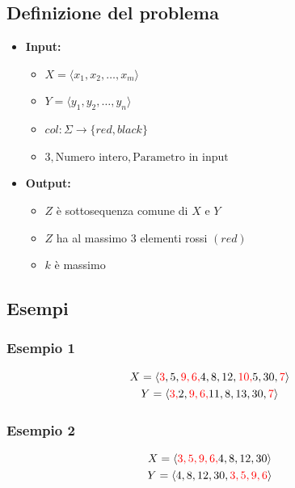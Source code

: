 \subsection{Definizione del problema}
\begin{itemize}
    \item \textbf{Input:}
    \begin{itemize}
        \item $X = \langle x_1, x_2, \dots, x_m \rangle$
        \item $Y = \langle y_1, y_2, \dots, y_n \rangle$
        \item $col: \Sigma \to \{red,black\}$
        \item $3, \text{Numero intero}, \text{Parametro in input}$
    \end{itemize}
    \item \textbf{Output:}
    \begin{itemize}
        \item $Z$ è sottosequenza comune di $X$ e $Y$
        \item $Z$ ha al massimo $3$ elementi rossi $(red)$
        \item $k$ è massimo
    \end{itemize}
\end{itemize}

\subsection{Esempi}

\subsubsection{Esempio 1}
{
    \Large
    \begin{gather*}
        X = \langle {\color{red} 3},5, {\color{red}9,6,}4,8,12, {\color{red} 10,}5,30 ,{\color{red} 7}\rangle \\
        Y = \langle {\color{red} 3,}2, {\color{red} 9,6,} 11, 8, 13, 30, {\color{red} 7} \rangle
    \end{gather*}
}

\subsubsection{Esempio 2}
{
    \Large
    \begin{gather*}
        X = \langle {\color{red} 3,5,9,6,} 4,8,12,30 \rangle \\
        Y = \langle 4,8,12,30, {\color{red} 3,5,9,6} \rangle
    \end{gather*}
}

